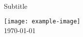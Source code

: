 \begin{titlingpage}
\begin{center}
\vspace*{2cm}\noindent

\Huge \textbf{  \DocMainTitle  }
\\[0.6cm]

{\LARGE  Subtitle }
\vspace*{3cm}\par\noindent

\textbf{  \DocAuthors  }
\vfill

\texttt{[image: example-image]}
\\[1.5cm]

\Large
\DocVersion
\today

\end{center}
\end{titlingpage}